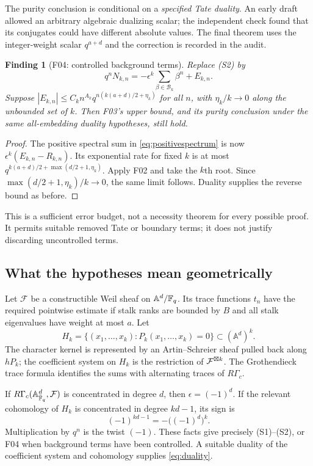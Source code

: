 \documentclass[11pt,a4paper]{article}
\newcommand{\A}{\mathbb A}\newcommand{\PP}{\mathbb P}\newcommand{\GL}{\mathrm{GL}}
\newcommand{\fid}[1]{\textsf{#1}}\newcommand{\gate}[1]{\textsf{#1}}
\theoremstyle{named}\newtheorem{finding}{Finding}[section]
\theoremstyle{definition}\newtheorem{definition}[finding]{Definition}
\theoremstyle{remark}\newtheorem{remark}[finding]{Remark}
\begin{document}
The purity conclusion is conditional on a \emph{specified Tate duality}. An early draft allowed an arbitrary algebraic dualizing scalar; the independent check found that its conjugates could have different absolute values. The final theorem uses the integer-weight scalar $q^{a+d}$ and the correction is recorded in the audit.

\begin{finding}[\fid{F04}: controlled background terms]\label{f:errors}
Replace (S2) by
\[
 q^nN_{k,n}=-\epsilon^k\sum_{\beta\in\mathcal B_k}\beta^n+E_{k,n}.
\]
Suppose $|E_{k,n}|\le C_kn^{A_k}q^{n(k(a+d)/2+\eta_k)}$ for all $n$, with $\eta_k/k\to0$ along the unbounded set of $k$. Then \fid{F03}'s upper bound, and its purity conclusion under the same all-embedding duality hypotheses, still hold.
\end{finding}
\begin{proof}
The positive spectral sum in \eqref{eq:positivespectrum} is now $\epsilon^k(E_{k,n}-R_{k,n})$. Its exponential rate for fixed $k$ is at most
$q^{k(a+d)/2+\max(d/2+1,\eta_k)}$. Apply \fid{F02} and take the $k$th root. Since $\max(d/2+1,\eta_k)/k\to0$, the same limit follows. Duality supplies the reverse bound as before.
\end{proof}
This is a sufficient error budget, not a necessity theorem for every possible proof. It permits suitable removed Tate or boundary terms; it does not justify discarding uncontrolled terms.

\subsection{What the hypotheses mean geometrically}\label{sec:tracegeom}
Let $\mathcal F$ be a constructible Weil sheaf on $\A^d/\F_q$. Its trace functions $t_n$ have the required pointwise estimate if stalk ranks are bounded by $B$ and all stalk eigenvalues have weight at most $a$. Let
\[
 H_k=\{(x_1,\ldots,x_k):P_k(x_1,\ldots,x_k)=0\}
 \subset(\A^d)^k.
\]
The character kernel is represented by an Artin--Schreier sheaf pulled back along $hP_k$; the coefficient system on $H_k$ is the restriction of $\mathcal F^{\boxtimes k}$. The Grothendieck trace formula identifies the sums with alternating traces of $R\Gamma_c$.

If $R\Gamma_c(\A^d_{\bar{\F}_q},\mathcal F)$ is concentrated in degree $d$, then $\epsilon=(-1)^d$. If the relevant cohomology of $H_k$ is concentrated in degree $kd-1$, its sign is
\[
 (-1)^{kd-1}=-\bigl((-1)^d\bigr)^k.
\]
Multiplication by $q^n$ is the twist $(-1)$. These facts give precisely (S1)--(S2), or \fid{F04} when background terms have been controlled. A suitable duality of the coefficient system and cohomology supplies \eqref{eq:duality}.
\end{document}
